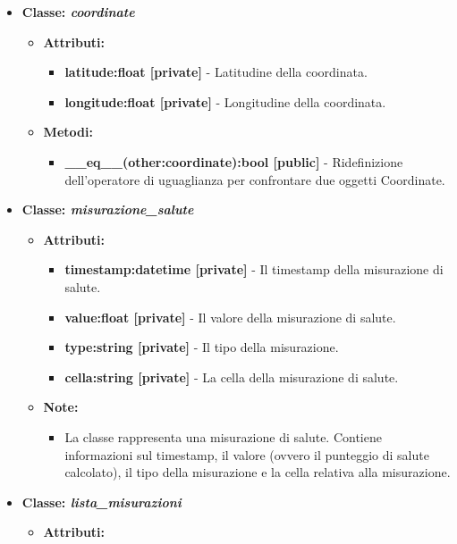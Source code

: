 \begin{itemize}
    \item\textbf{Classe: \textit{coordinate}}
    \begin{itemize}
        \item    \textbf{Attributi:} 
    \begin{itemize}
        \item \textbf{latitude:float [private]} - Latitudine della coordinata.
        \item \textbf{longitude:float [private]} - Longitudine della coordinata.
    \end{itemize}
    \item     \textbf{Metodi:} 
    \begin{itemize}
        \item \textbf{\_\_eq\_\_(other:coordinate):bool [public]} - Ridefinizione dell'operatore di uguaglianza per confrontare due oggetti Coordinate.
    \end{itemize}
\end{itemize}
\item\textbf{Classe: \textit{misurazione\_salute}}
    \begin{itemize}
    \item\textbf{Attributi:}
        \begin{itemize}
        \item \textbf{timestamp:datetime [private]} - Il timestamp della misurazione di salute.
        \item \textbf{value:float [private]} - Il valore della misurazione di salute.
        \item \textbf{type:string [private]} - Il tipo della misurazione.
        \item \textbf{cella:string [private]} - La cella della misurazione di salute.
    \end{itemize}
    \item\textbf{Note:}
        \begin{itemize}
            \item La classe rappresenta una misurazione di salute. Contiene informazioni sul timestamp, il valore (ovvero il punteggio di salute calcolato), il tipo della misurazione e la cella relativa alla misurazione.
        \end{itemize}
    \end{itemize}
    \item\textbf{Classe: \textit{lista\_misurazioni}}
    \begin{itemize}
    \item\textbf{Attributi:}
        \begin{itemize}

\end{itemize}
\end{itemize}
\end{itemize}
